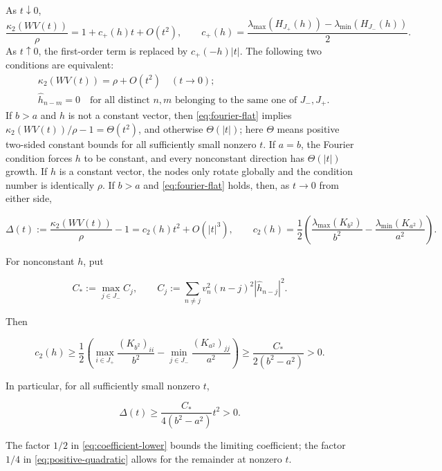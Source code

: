 \documentclass[10pt,twoside,final]{siamart1116}
\numberwithin{equation}{section}
\numberwithin{theorem}{section}
\newcommand{\cond}{\kappa_2}
\begin{document}
\begin{theorem}
\label{thm:directional}
As $t\downarrow0$,
\begin{equation}\label{eq:directional-slope}
\frac{\cond(WV(t))}{\rho}
=1+c_+(h)t+O(t^2),\qquad
c_+(h)=\frac{\lambda_{\max}(H_{J_+}(h))-\lambda_{\min}(H_{J_-}(h))}{2}.
\end{equation}
As $t\uparrow0$, the first-order term is replaced by $c_+(-h)|t|$. The following two
conditions are equivalent:
\begin{align}
&\cond(WV(t))=\rho+O(t^2)\quad(t\to0);\label{eq:quadratic-flat}\\
&\widehat h_{n-m}=0\quad\text{for all distinct } n,m \text{ belonging to the same one
of } J_-,J_+.\label{eq:fourier-flat}
\end{align}
If $b>a$ and $h$ is not a constant vector, then \eqref{eq:fourier-flat} implies
$\cond(WV(t))/\rho-1=\Theta(t^2)$, and otherwise $\Theta(|t|)$; here $\Theta$ means
positive two-sided constant bounds for all sufficiently small nonzero $t$. If $a=b$, the Fourier condition forces $h$ to be constant, and every nonconstant
direction has $\Theta(|t|)$ growth. If $h$ is a
constant vector, the nodes only rotate globally and the condition number is identically
$\rho$.
If $b>a$ and \eqref{eq:fourier-flat} holds, then, as $t\to0$ from either side,

\begin{equation}\label{eq:general-second}
\Delta(t):=\frac{\cond(WV(t))}{\rho}-1=c_2(h)t^2+O(|t|^3),\qquad
c_2(h)=\frac12\left(\frac{\lambda_{\max}(K_{b^2})}{b^2}
-\frac{\lambda_{\min}(K_{a^2})}{a^2}\right).
\end{equation}

For nonconstant $h$, put

\[
C_*:=\max_{j\in J_-}C_j,\qquad
C_j:=\sum_{n\ne j}v_n^2(n-j)^2|\widehat h_{n-j}|^2.
\]

Then

\begin{equation}\label{eq:coefficient-lower}
c_2(h)\ge\frac12\left(
\max_{i\in J_+}\frac{(K_{b^2})_{ii}}{b^2}
-\min_{j\in J_-}\frac{(K_{a^2})_{jj}}{a^2}\right)
\ge\frac{C_*}{2(b^2-a^2)}>0.
\end{equation}

In particular, for all sufficiently small nonzero $t$,

\begin{equation}\label{eq:positive-quadratic}
\Delta(t)\ge\frac{C_*}{4(b^2-a^2)}t^2>0.
\end{equation}

The factor $1/2$ in \eqref{eq:coefficient-lower} bounds the limiting coefficient;
the factor $1/4$ in \eqref{eq:positive-quadratic} allows for the remainder at nonzero $t$.
\end{theorem}
\end{document}
